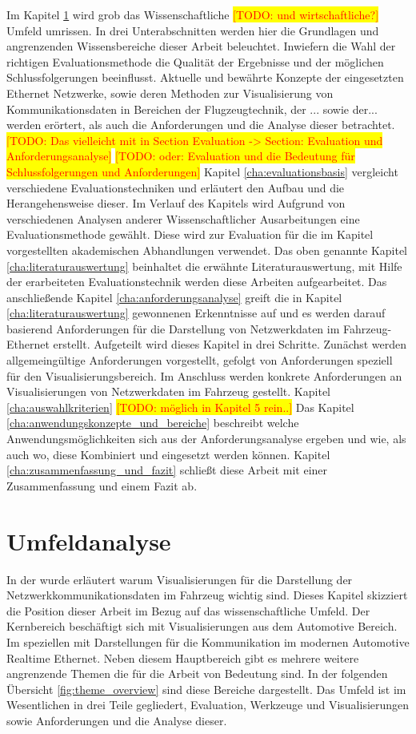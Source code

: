 \documentclass[draft=false
              ,paper=a4
              ,twoside=false
              ,fontsize=11pt
              ,headsepline
              ,BCOR10mm
              ,DIV11
              ]{scrbook}
\newcommand{\TODO}[1]{\colorbox{yellow}{\textcolor{red}{[TODO: #1]}}}
\begin{document}
Im Kapitel \ref{cha:umfeldanalyse} wird grob das Wissenschaftliche \TODO{und wirtschaftliche?} Umfeld umrissen. In drei Unterabschnitten werden hier die Grundlagen und angrenzenden Wissensbereiche dieser Arbeit beleuchtet. Inwiefern die Wahl der richtigen Evaluationsmethode die Qualität der Ergebnisse und der möglichen Schlussfolgerungen beeinflusst. Aktuelle und bewährte Konzepte der eingesetzten Ethernet Netzwerke, sowie deren Methoden zur Visualisierung von Kommunikationsdaten in Bereichen der Flugzeugtechnik, der ... sowie der... werden erörtert, als auch die Anforderungen und die Analyse dieser betrachtet. \TODO{Das vielleicht mit in Section Evaluation -> Section: Evaluation und Anforderungsanalyse} \TODO{oder: Evaluation und die Bedeutung für Schlussfolgerungen und Anforderungen}
Kapitel \ref{cha:evaluationsbasis} vergleicht verschiedene Evaluationstechniken und erläutert den Aufbau und die Herangehensweise dieser. Im Verlauf des Kapitels wird Aufgrund von verschiedenen Analysen anderer Wissenschaftlicher Ausarbeitungen eine Evaluationsmethode gewählt. Diese wird zur Evaluation für die im Kapitel  vorgestellten akademischen Abhandlungen verwendet. Das oben genannte Kapitel \ref{cha:literaturauswertung} beinhaltet die erwähnte Literaturauswertung, mit Hilfe der erarbeiteten Evaluationstechnik werden diese Arbeiten aufgearbeitet. Das anschließende Kapitel \ref{cha:anforderungsanalyse} greift die in Kapitel \ref{cha:literaturauswertung} gewonnenen Erkenntnisse auf und es werden darauf basierend Anforderungen für die Darstellung von Netzwerkdaten im Fahrzeug-Ethernet erstellt. Aufgeteilt wird dieses Kapitel in drei Schritte. Zunächst werden allgemeingültige Anforderungen vorgestellt, gefolgt von Anforderungen speziell für den Visualisierungsbereich. Im Anschluss werden konkrete Anforderungen an Visualisierungen von Netzwerkdaten im Fahrzeug gestellt. Kapitel \ref{cha:auswahlkriterien} \TODO{möglich in Kapitel 5 rein..}
Das Kapitel \ref{cha:anwendungskonzepte_und_bereiche} beschreibt welche Anwendungsmöglichkeiten sich aus der Anforderungsanalyse ergeben und wie, als auch wo, diese Kombiniert und eingesetzt werden können. Kapitel \ref{cha:zusammenfassung_und_fazit} schließt diese Arbeit mit einer Zusammenfassung und einem Fazit ab.

\chapter{Umfeldanalyse} %
\label{cha:umfeldanalyse}
In der  wurde erläutert warum Visualisierungen für die Darstellung der Netzwerkkommunikationsdaten im Fahrzeug wichtig sind. Dieses Kapitel skizziert die Position dieser Arbeit im Bezug auf das wissenschaftliche Umfeld. Der Kernbereich beschäftigt sich mit Visualisierungen aus dem Automotive Bereich. Im speziellen mit Darstellungen für die Kommunikation im modernen Automotive Realtime Ethernet. Neben diesem Hauptbereich gibt es mehrere weitere angrenzende Themen die für die Arbeit von Bedeutung sind. In der folgenden Übersicht \ref{fig:theme_overview} sind diese Bereiche dargestellt. Das Umfeld ist im Wesentlichen in drei Teile gegliedert, Evaluation, Werkzeuge und Visualisierungen sowie Anforderungen und die Analyse dieser. 
\end{document}
